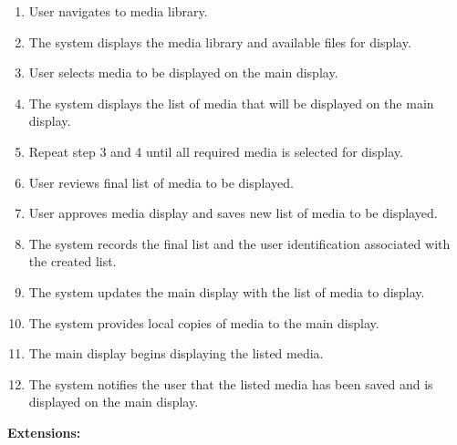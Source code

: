 \documentclass{article}
\begin{document}
    \begin{enumerate}
        \item User navigates to media library.
        \item The system displays the media library and available files for display.
        \item User selects media to be displayed on the main display.
        \item The system displays the list of media that will be displayed on the main display.
        \item Repeat step 3 and 4 until all required media is selected for display.
        \item User reviews final list of media to be displayed.
        \item User approves media display and saves new list of media to be displayed.
        \item The system records the final list and the user identification associated with the created list.
        \item The system updates the main display with the list of media to display.
        \item The system provides local copies of media to the main display.
        \item The main display begins displaying the listed media.
        \item The system notifies the user that the listed media has been saved and is displayed on the main display.
    \end{enumerate}
    \textbf{Extensions:}
\end{document}
